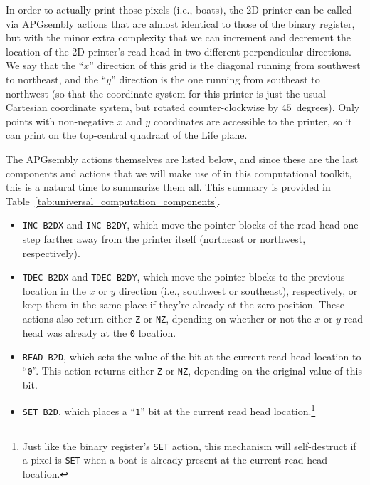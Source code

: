 In order to actually print those pixels (i.e., boats), the 2D printer can be called via APGsembly actions that are almost identical to those of the binary register, but with the minor extra complexity that we can increment and decrement the location of the 2D printer's read head  in two different perpendicular directions. We say that the ``$x$'' direction of this grid is the diagonal running from southwest to northeast, and the ``$y$'' direction is the one running from southeast to northwest (so that the coordinate system for this printer is just the usual Cartesian coordinate system, but rotated counter-clockwise by $45$~degrees). Only points with non-negative $x$ and $y$ coordinates are accessible to the printer, so it can print on the top-central quadrant of the Life plane.

The APGsembly actions themselves are listed below, and since these are the last components and actions that we will make use of in this computational toolkit, this is a natural time to summarize them all. This summary is provided in Table~\ref{tab:universal_computation_components}.\smallskip

\begin{itemize}
	\item \texttt{INC B2DX} and \texttt{INC B2DY}, which move the pointer blocks of the read head one step farther away from the printer itself (northeast or northwest, respectively).\smallskip
	
	\item \texttt{TDEC B2DX} and \texttt{TDEC B2DY}, which move the pointer blocks to the previous location in the $x$ or $y$ direction (i.e., southwest or southeast), respectively, or keep them in the same place if they're already at the zero position. These actions also return either \texttt{Z} or \texttt{NZ}, dpending on whether or not the $x$ or $y$ read head was already at the \texttt{0} location.\smallskip
	
	\item \texttt{READ B2D}, which sets the value of the bit at the current read head location to ``\texttt{0}''. This action returns either \texttt{Z} or \texttt{NZ}, depending on the original value of this bit.\smallskip
	
	\item \texttt{SET B2D}, which places a ``\texttt{1}'' bit at the current read head location.\footnote{Just like the binary register's \texttt{SET} action, this mechanism will self-destruct if a pixel is \texttt{SET} when a boat is already present at the current read head location.}\smallskip
\end{itemize}

